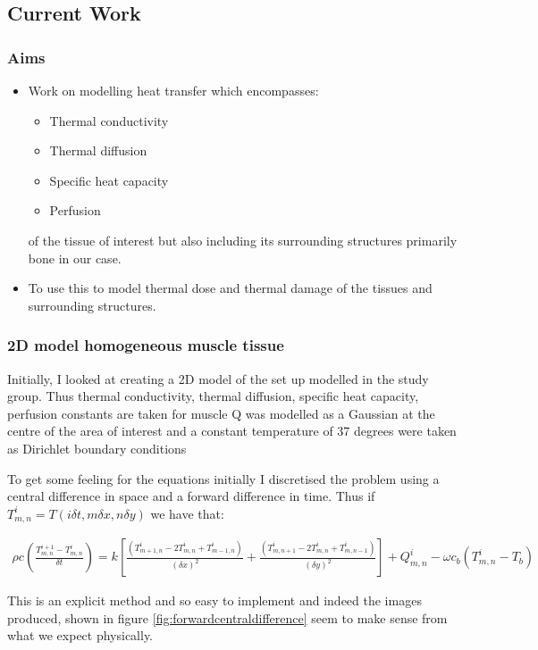 \documentclass[11pt]{article} %
\begin{document}
\subsection{Current Work } 
 \subsubsection{Aims}
 
\begin{itemize}
	\item  Work on modelling heat transfer which encompasses: 
\begin{itemize}
	\item  Thermal conductivity
\item  Thermal diffusion 
\item  Specific heat capacity
\item  Perfusion 
\end{itemize}
 of the tissue of interest but also including its surrounding structures primarily bone in our case.
 
\item To use this  to model thermal dose and thermal damage of the tissues and surrounding structures. 
\end{itemize}
 
 \subsubsection{2D model homogeneous muscle tissue}
Initially, I looked at creating a 2D model of the set up modelled in the study group. Thus thermal conductivity, thermal diffusion, specific heat capacity, perfusion constants are taken for muscle 
Q was modelled as a Gaussian at the centre of the area of interest and a constant temperature of 37 degrees  were taken as Dirichlet boundary conditions 

To get some feeling for the equations initially I discretised the problem using a central difference in space and a forward difference in time. Thus if $T^i_{m,n}= T(i\delta t, m\delta x, n\delta y)$ we have that:

\begin{eqnarray}
\rho c \left( \frac{T^{i+1}_{m,n}-T^i_{m,n}}{\delta t}\right)= k\left[  \frac{(T^i_{m+1,n}-2T^i_{m,n}+T^i_{m-1,n})}{(\delta x)^2}+\frac{(T^i_{m,n+1}-2T^i_{m,n}+T^i_{m,n-1})}{(\delta y)^2}\right] +Q^i_{m,n}-\omega c_b(T^i_{m,n}-T_b) \label{euler method}
\end{eqnarray}

This is an explicit method and so easy to implement and indeed the images produced, shown in figure \ref{fig:forwardcentraldifference} seem to make sense from what we expect physically. 
\end{document}
